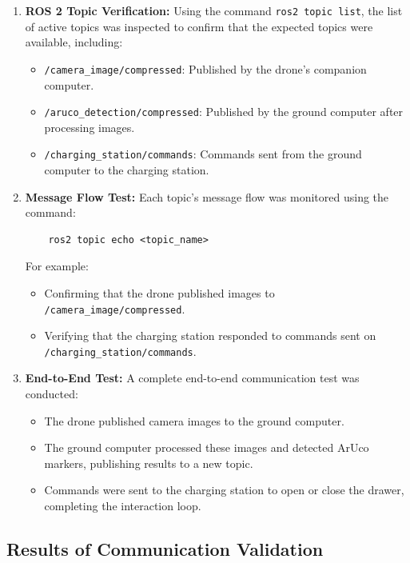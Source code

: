 \begin{enumerate}
    \item \textbf{ROS 2 Topic Verification:}
    Using the command \texttt{ros2 topic list}, the list of active topics was inspected to confirm that the expected topics were available, including:
    \begin{itemize}
        \item \texttt{/camera\_image/compressed}: Published by the drone's companion computer.
        \item \texttt{/aruco\_detection/compressed}: Published by the ground computer after processing images.
        \item \texttt{/charging\_station/commands}: Commands sent from the ground computer to the charging station.
    \end{itemize}
    
    \item \textbf{Message Flow Test:}
    Each topic's message flow was monitored using the command:
    \begin{verbatim}
    ros2 topic echo <topic_name>
    \end{verbatim}
    For example:
    \begin{itemize}
        \item Confirming that the drone published images to \texttt{/camera\_image/compressed}.
        \item Verifying that the charging station responded to commands sent on \texttt{/charging\_station/commands}.
    \end{itemize}

    \item \textbf{End-to-End Test:}
    A complete end-to-end communication test was conducted:
    \begin{itemize}
        \item The drone published camera images to the ground computer.
        \item The ground computer processed these images and detected ArUco markers, publishing results to a new topic.
        \item Commands were sent to the charging station to open or close the drawer, completing the interaction loop.
    \end{itemize}
\end{enumerate}

\subsection{Results of Communication Validation}

